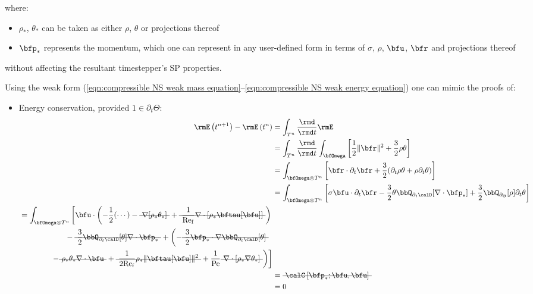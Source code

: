     where:
    \begin{itemize}
        \item  $\rho_{*}$, $\theta_{*}$ can be taken as either $\rho$, $\theta$ or projections thereof
        \item  $\bfp_{*}$ represents the momentum, which one can represent in any user-defined form in terms of $\sigma$, $\rho$, $\bfu$, $\bfr$ and projections thereof
    \end{itemize}
    without affecting the resultant timestepper's SP properties.

    \line

    Using the weak form (\ref{eqn:compressible NS weak mass equation}--\ref{eqn:compressible NS weak energy equation}) one can mimic the proofs of:
    \begin{itemize}
        \item  Energy conservation, provided $1 \in \partial_{t}\Theta$:
        \begin{align}
                \rmE\left(t^{n + 1}\right) - \rmE\left(t^{n}\right)
                &=  \int_{T^{n}}\frac{\rmd}{\rmd t}\rmE  \\
                &=  \int_{T^{n}}\frac{\rmd}{\rmd t}\int_{\bfOmega}\left[\frac{1}{2}\|\bfr\|^{2} + \frac{3}{2}\rho\theta\right]  \\
                &=  \int_{\bfOmega\otimes T^{n}}\left[\bfr\cdot\partial_{t}\bfr + \frac{3}{2}(\partial_{t}\rho\theta + \rho\partial_{t}\theta)\right]  \\
                &=  \int_{\bfOmega\otimes T^{n}}\left[\sigma\bfu\cdot\partial_{t}\bfr - \frac{3}{2}\theta\bbQ_{\partial_{t}\calD}[\nabla\cdot\bfp_{*}] + \frac{3}{2}\bbQ_{\partial_{\Theta}}[\rho]\partial_{t}\theta\right]  \\
            \begin{split}
                &=  \int_{\bfOmega\otimes T^{n}}\left[\bfu\cdot\left(- \frac{1}{2}(\cdots) - \mst{\nabla[\rho_{*}\theta_{*}]} + \mst{\frac{1}{\rmRef}\nabla\cdot[\rho_{*}\bftau[\bfu]]}\right)\right.  \\
                &\qquad\qquad\qquad- \mst{\frac{3}{2}\bbQ_{\partial_{t}\calD}[\theta]\nabla\cdot\bfp_{*}} + \left(- \mst{\frac{3}{2}\bfp_{*}\cdot\nabla\bbQ_{\partial_{t}\calD}[\theta]}\right.  \\
                &\qquad\qquad\left.\left.- \mst{\rho_{*}\theta_{*}\nabla\cdot\bfu} + \mst{\frac{1}{2\rmRef}\rho_{*}\|\bftau[\bfu]\|^{2}} + \frac{1}{\rmPe}\mst{\nabla\cdot[\rho_{*}\nabla\theta_{*}]}\right)\right]
            \end{split}  \\
                &=  \mst{\calC\left[\bfp_{*}; \bfu, \bfu\right]}  \\
                &=  0
        \end{align}


\end{itemize}
